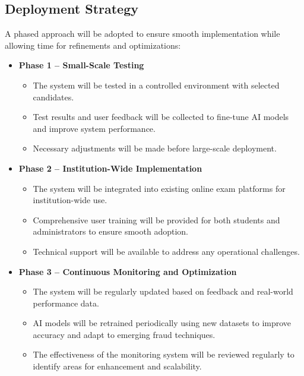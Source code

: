 \documentclass[12pt,a4paper]{article}
\begin{document}
\subsection{Deployment Strategy}

A phased approach will be adopted to ensure smooth implementation while allowing time for refinements and optimizations:

\begin{itemize}
    \item \textbf{Phase 1 – Small-Scale Testing}
    \begin{itemize}
        \item The system will be tested in a controlled environment with selected candidates.
        \item Test results and user feedback will be collected to fine-tune AI models and improve system performance.
        \item Necessary adjustments will be made before large-scale deployment.
    \end{itemize}

    \item \textbf{Phase 2 – Institution-Wide Implementation}
    \begin{itemize}
        \item The system will be integrated into existing online exam platforms for institution-wide use.
        \item Comprehensive user training will be provided for both students and administrators to ensure smooth adoption.
        \item Technical support will be available to address any operational challenges.
    \end{itemize}

    \item \textbf{Phase 3 – Continuous Monitoring and Optimization}
    \begin{itemize}
        \item The system will be regularly updated based on feedback and real-world performance data.
        \item AI models will be retrained periodically using new datasets to improve accuracy and adapt to emerging fraud techniques.
        \item The effectiveness of the monitoring system will be reviewed regularly to identify areas for enhancement and scalability.
    \end{itemize}
\end{itemize}
\end{document}
